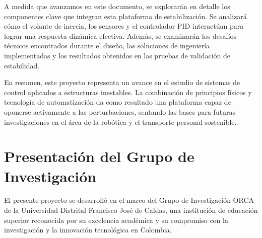 \documentclass[12pt,letterpaper]{report}
\begin{document}
A medida que avanzamos en este documento, se explorarán en detalle los componentes clave que integran esta plataforma de estabilización. Se analizará cómo el volante de inercia, los sensores y el controlador PID interactúan para lograr una respuesta dinámica efectiva. Además, se examinarán los desafíos técnicos encontrados durante el diseño, las soluciones de ingeniería implementadas y los resultados obtenidos en las pruebas de validación de estabilidad.

En resumen, este proyecto representa un avance en el estudio de sistemas de control aplicados a estructuras inestables. La combinación de principios físicos y tecnología de automatización da como resultado una plataforma capaz de oponerse activamente a las perturbaciones, sentando las bases para futuras investigaciones en el área de la robótica y el transporte personal sostenible.

\chapter{Presentación del Grupo de Investigación}

El presente proyecto se desarrolló en el marco del Grupo de Investigación ORCA de la Universidad Distrital Francisco José de Caldas, una institución de educación superior reconocida por su excelencia académica y su compromiso con la investigación y la innovación tecnológica en Colombia.
\end{document}
